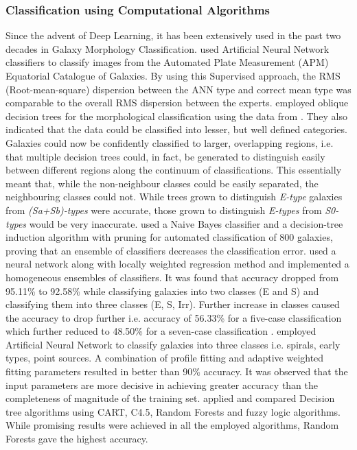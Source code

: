 \documentclass[fleqn,usenatbib]{mnras}
\begin{document}
\subsubsection{\textbf{Classification using Computational Algorithms}}

\hspace{0.25 in}Since the advent of Deep Learning, it has been extensively used in the past two decades in Galaxy Morphology Classification. \citet{Naim/mnras/275.3.567} used Artificial Neural Network classifiers to classify images from the Automated Plate Measurement (APM) Equatorial Catalogue of Galaxies. By using this Supervised approach, the RMS (Root-mean-square) dispersion between the ANN type and correct mean type was comparable to the overall RMS dispersion between the experts.  \citet{Owens/mnras/281.1.153} employed oblique decision trees for the morphological classification using the data from \citet{Storrie1992}. They also indicated that the data could be classified into lesser, but well defined categories. Galaxies could now be confidently classified to larger, overlapping regions, i.e. that multiple decision trees could, in fact, be generated to distinguish easily between different regions along the continuum of classifications. This essentially meant that, while the non-neighbour  classes could be easily separated, the neighbouring classes could not. While trees grown to distinguish \textit{E-type} galaxies from \textit{(Sa+Sb)-types} were accurate, those grown to distinguish \textit{E-types} from \textit{S0-types} would be very inaccurate. \citet{Bazell_2001} used a Naive Bayes classifier and a decision-tree induction algorithm with pruning for automated classification of 800 galaxies, proving that an ensemble of classifiers decreases the classification error. \citet{De_La_Calleja2004} used a neural network along with locally weighted regression method and implemented a homogeneous ensembles of classifiers. It was found that accuracy dropped from 95.11\% to 92.58\% while classifying galaxies into two classes (E and S) and classifying them into three classes (E, S, Irr). Further increase in classes caused the accuracy to drop further i.e. accuracy of 56.33\% for a five-case classification which further reduced to 48.50\% for a seven-case classification \citep{De_La_Calleja2004}. \citet{Banerji_2010} employed Artificial Neural Network to classify  galaxies into three classes i.e. spirals, early types, point sources. A combination of profile fitting and adaptive weighted fitting parameters resulted in better than 90\% accuracy. It was observed that the input parameters are more decisive in achieving greater accuracy than the completeness of magnitude of the training set. \citet{Gauci2010} applied and compared Decision tree algorithms using CART, C4.5, Random Forests and fuzzy logic algorithms. While promising results were achieved in all the employed algorithms, Random Forests gave the highest accuracy.\\
\end{document}
